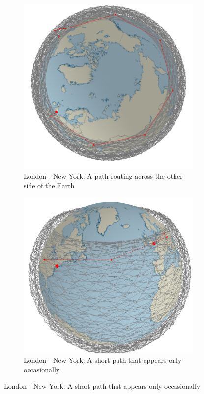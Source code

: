 \documentclass[12pt,a4paper,twoside,openright]{report}
\begin{document}
\begin{figure}
	\centering
	\caption{Screenshots of DistL creating extremely long links between locations}
	\label{fig:Screenshots of DistL}
	\begin{subfigure}[b]{0.4\textwidth}
		\caption{London - New York: A path routing across the other side of the Earth}
		\includegraphics[width=\textwidth]{LDN-NY-DISTL-1}
	\end{subfigure}
	\hfill
	\begin{subfigure}[b]{0.4\textwidth}
		\caption{London - New York: A short path that appears only occasionally}
		\includegraphics[width=\textwidth]{LDN-NY-DISTL-2}
	\end{subfigure}
	

\end{figure}
\end{document}
